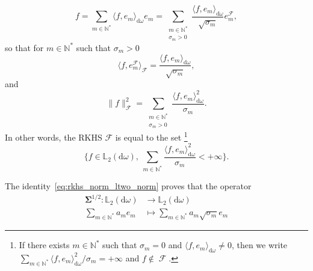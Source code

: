 \documentclass[twoside,11pt]{book}
\numberwithin{theorem}{chapter}
\numberwithin{definition}{chapter}
\numberwithin{proposition}{chapter}
\numberwithin{corollary}{chapter}
\numberwithin{example}{chapter}
\numberwithin{lemma}{chapter}
\numberwithin{assumption}{chapter}
\DeclareMathOperator{\F}{\mathcal{F}}
\begin{document}
\begin{equation}
f  = \sum\limits_{m \in \mathbb{N}^{*}} \langle f, e_m \rangle_{\mathrm{d}\omega} e_m =  \sum\limits_{\substack{m \in \mathbb{N}^{*}\\ \sigma_m >0}} \frac{\langle f, e_m \rangle_{\mathrm{d}\omega}}{\sqrt{\sigma_m}} e_{m}^{\F},
\end{equation}
so that for $m \in \mathbb{N}^{*}$ such that $\sigma_m>0$
\begin{equation}
 \langle f, e_{m}^{\F} \rangle_{\F} = \frac{\langle f,e_m \rangle_{\mathrm{d}\omega}}{\sqrt{\sigma_m}}, 
\end{equation}
and
\begin{equation}\label{eq:rkhs_norm_ltwo_norm}
\|f\|_{\F}^{2} = \sum\limits_{\substack{m \in \mathbb{N}^{*}\\\sigma_m >0}} \frac{\langle f, e_m \rangle_{\mathrm{d}\omega}^{2}}{\sigma_m}.
\end{equation}
In other words, the RKHS $\mathcal{F}$ is equal to the set \footnote{If there exists $m \in \mathbb{N}^{*}$ such that $\sigma_m = 0$ and $\langle f, e_m \rangle_{\mathrm{d}\omega} \neq 0$, then we write $\sum\limits_{m \in \mathbb{N}^{*}} \langle f,e_m \rangle_{\mathrm{d}\omega}^{2}/\sigma_m = +\infty$ and $f \notin \F$.}
\begin{equation}
\bigg \{ f \in \mathbb{L}_{2}(\mathrm{d}\omega), \: \sum\limits_{m \in \mathbb{N}^{*}} \frac{\langle f,e_m \rangle_{\mathrm{d}\omega}^{2}}{\sigma_m} < +\infty \bigg\}.
\end{equation}

The identity~\eqref{eq:rkhs_norm_ltwo_norm} proves that the operator
\begin{align*}
\bm{\Sigma}^{1/2}: \mathbb{L}_{2}(\mathrm{d}\omega) & \longrightarrow \mathbb{L}_{2}(\mathrm{d}\omega) \\
 \sum\limits_{m \in \mathbb{N}^{*}} a_{m} e_m & \longmapsto \sum\limits_{m \in \mathbb{N}^{*}} a_m\sqrt{\sigma_{m}} e_{m}
\end{align*}
\end{document}
